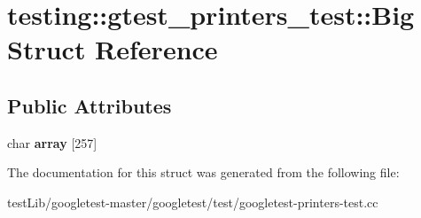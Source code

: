 \hypertarget{structtesting_1_1gtest__printers__test_1_1Big}{}\section{testing\+:\+:gtest\+\_\+printers\+\_\+test\+:\+:Big Struct Reference}
\label{structtesting_1_1gtest__printers__test_1_1Big}
\subsection*{Public Attributes}
\begin{DoxyCompactItemize}
\item 
\mbox{\label{structtesting_1_1gtest__printers__test_1_1Big_a863911a8ec5c3bbe79c44d399f1de61f}} 
char {\bfseries array} \mbox{[}257\mbox{]}
\end{DoxyCompactItemize}


The documentation for this struct was generated from the following file\+:\begin{DoxyCompactItemize}
\item 
test\+Lib/googletest-\/master/googletest/test/googletest-\/printers-\/test.\+cc\end{DoxyCompactItemize}
